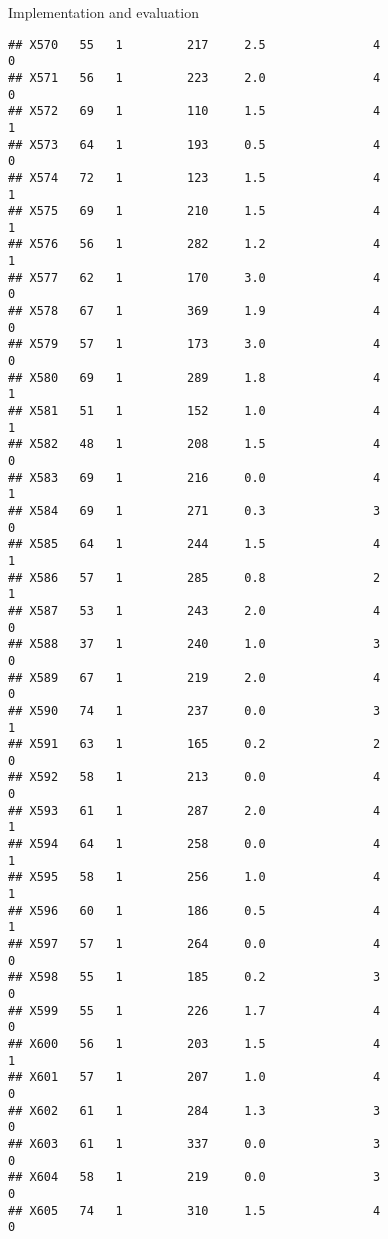 \documentclass[
  ignorenonframetext,
]{beamer}
\begin{document}
\begin{frame}[fragile]{Implementation and evaluation}
\begin{verbatim}
## X570   55   1         217     2.5               4                   0
## X571   56   1         223     2.0               4                   0
## X572   69   1         110     1.5               4                   1
## X573   64   1         193     0.5               4                   0
## X574   72   1         123     1.5               4                   1
## X575   69   1         210     1.5               4                   1
## X576   56   1         282     1.2               4                   1
## X577   62   1         170     3.0               4                   0
## X578   67   1         369     1.9               4                   0
## X579   57   1         173     3.0               4                   0
## X580   69   1         289     1.8               4                   1
## X581   51   1         152     1.0               4                   1
## X582   48   1         208     1.5               4                   0
## X583   69   1         216     0.0               4                   1
## X584   69   1         271     0.3               3                   0
## X585   64   1         244     1.5               4                   1
## X586   57   1         285     0.8               2                   1
## X587   53   1         243     2.0               4                   0
## X588   37   1         240     1.0               3                   0
## X589   67   1         219     2.0               4                   0
## X590   74   1         237     0.0               3                   1
## X591   63   1         165     0.2               2                   0
## X592   58   1         213     0.0               4                   0
## X593   61   1         287     2.0               4                   1
## X594   64   1         258     0.0               4                   1
## X595   58   1         256     1.0               4                   1
## X596   60   1         186     0.5               4                   1
## X597   57   1         264     0.0               4                   0
## X598   55   1         185     0.2               3                   0
## X599   55   1         226     1.7               4                   0
## X600   56   1         203     1.5               4                   1
## X601   57   1         207     1.0               4                   0
## X602   61   1         284     1.3               3                   0
## X603   61   1         337     0.0               3                   0
## X604   58   1         219     0.0               3                   0
## X605   74   1         310     1.5               4                   0

\end{verbatim}
\end{frame}
\end{document}
